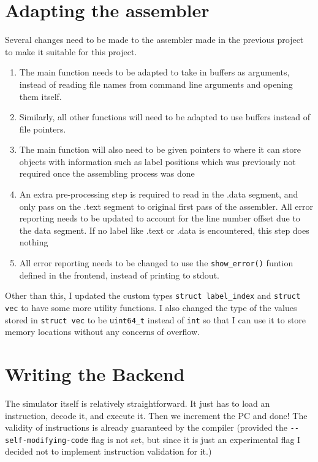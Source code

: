 \documentclass[12pt]{article}
\begin{document}
	\section{Adapting the assembler}

	Several changes need to be made to the assembler made in the previous project to make it suitable for this project.

	\begin{enumerate}
		\item The main function needs to be adapted to take in buffers as arguments, instead of reading file names from command line arguments and opening them itself.
		\item Similarly, all other functions will need to be adapted to use buffers instead of file pointers.
		\item The main function will also need to be given pointers to where it can store objects with information such as label positions which was previously not required once the assembling process was done
		\item An extra pre-processing step is required to read in the .data segment, and only pass on the .text segment to original first pass of the assembler. All error reporting needs to be updated to account for the line number offset due to the data segment. If no label like .text or .data is encountered, this step does nothing
		\item All error reporting needs to be changed to use the \verb|show_error()| funtion defined in the frontend, instead of printing to stdout.
	\end{enumerate}

	Other than this, I updated the custom types \verb|struct label_index| and \verb|struct vec| to have some more utility functions. I also changed the type of the values stored in \verb|struct vec| to be \verb|uint64_t| instead of \verb|int| so that I can use it to store memory locations without any concerns of overflow.

	\section{Writing the Backend}
	
	The simulator itself is relatively straightforward. It just has to load an instruction, decode it, and execute it. Then we increment the PC and done! The validity of instructions is already guaranteed by the compiler (provided the \verb|--self-modifying-code| flag is not set, but since it is just an experimental flag I decided not to implement instruction validation for it.)
	
\end{document}
